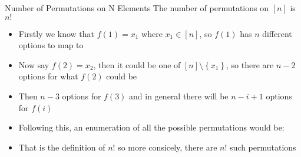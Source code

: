 \begin{theo*}{Number of Permutations on N Elements}
  The number of permutations on $ \left[ n \right]$ is $n!$ 
  \begin{pf}
    \begin{itemize}
      \item Firstly we know that $f\left(1\right) = x_1$ where $x_1 \in  \left[ n \right]$, so $f\left(1\right)$ has $n$ different options to map to
      \item Now say $ f\left(2\right) = x_{2}$, then it could be one of $ \left[ n \right] \setminus \left\{ x_{1} \right\}$, so there are $n-2$ options for what $f\left(2\right)$ could be
      \item Then $n-3$ options for $f\left(3\right)$ and in general there will be $n  - i + 1$ options for $f\left(i\right)$
      \item Following this, an enumeration of all the possible permutations would be:
      \item That is the definition of $n!$ so more consicely, there are $n!$ such permutations
    \end{itemize}
  \end{pf}
\end{theo*}
